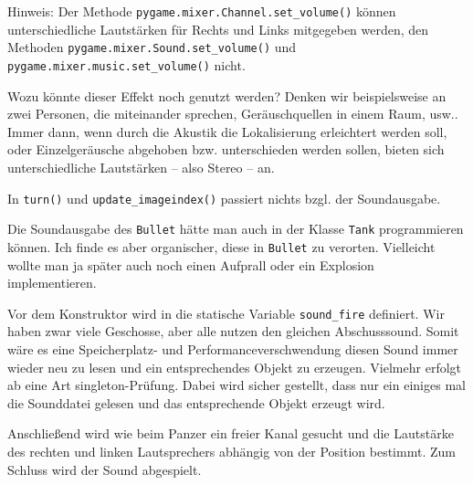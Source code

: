 Hinweis: Der Methode \texttt{pygame.mixer.Channel\-.set\-\_vol\-ume()} können unterschiedliche Lautstärken für Rechts und Links mitgegeben werden, den Methoden \texttt{pygame.mix\-er\-.Sound\-.set\-\_vol\-ume()} und \texttt{pygame.mixer.music\-.set\-\_vol\-ume()} nicht.


Wozu könnte dieser Effekt noch genutzt werden? Denken wir beispielsweise an zwei Personen, die miteinander sprechen, Geräuschquellen in einem Raum, usw.. Immer dann, wenn durch die Akustik die Lokalisierung erleichtert werden soll, oder Einzelgeräusche abgehoben bzw. unterschieden werden sollen, bieten sich unterschiedliche Lautstärken -- also Stereo -- an.

In \texttt{turn()} und \texttt{update\_imageindex()} passiert nichts bzgl. der Soundausgabe.


Die Soundausgabe des \texttt{Bullet} hätte man auch in der Klasse \texttt{Tank} programmieren können. Ich finde es aber organischer, diese in \texttt{Bullet} zu verorten. Vielleicht wollte man ja später auch noch einen Aufprall oder ein Explosion implementieren.

Vor dem Konstruktor wird in  die statische Variable \texttt{sound\_fire} definiert. Wir haben zwar viele Geschosse, aber alle nutzen den gleichen Abschusssound. Somit wäre es eine Speicherplatz- und Performanceverschwendung diesen Sound immer wieder neu zu lesen und ein entsprechendes Objekt zu erzeugen. Vielmehr erfolgt ab  eine Art \gls{singleton}-Prüfung. Dabei wird sicher gestellt, dass nur ein einiges mal die Sounddatei gelesen und das entsprechende Objekt erzeugt wird.

Anschließend wird wie beim Panzer ein freier Kanal gesucht und die Lautstärke des rechten und linken Lautsprechers abhängig von der Position bestimmt. Zum Schluss wird der Sound abgespielt.


